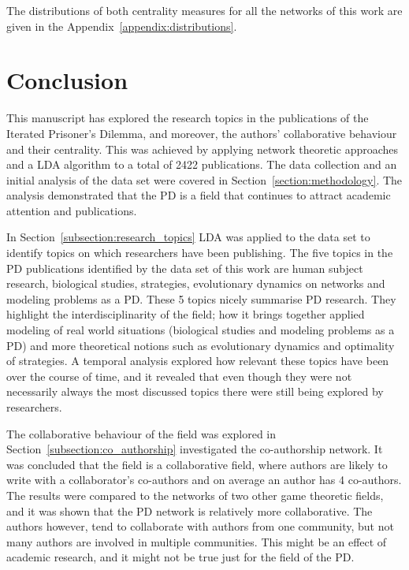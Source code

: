 \documentclass{article}
\theoremstyle{definition}
\begin{document}
The distributions of both centrality measures for all the networks of this
work are given in the Appendix~\ref{appendix:distributions}.

\section{Conclusion}\label{section:conclusion}

This manuscript has explored the research topics in the publications of the
Iterated Prisoner's Dilemma, and moreover, the authors' collaborative behaviour
and their centrality. This was achieved by
applying network theoretic approaches and a LDA algorithm to a total of 2422
publications.
The data collection and an initial analysis of the data set were covered in
Section~\ref{section:methodology}. The analysis  demonstrated that the PD is a
field that continues to attract academic attention and publications.

In Section~\ref{subsection:research_topics} LDA was applied to the data set to
identify topics on which researchers have been publishing. The five topics in
the PD publications identified by the data set of this work are human subject
research, biological studies, strategies, evolutionary dynamics on networks and
modeling problems as a PD. These 5 topics nicely summarise PD research. They
highlight the interdisciplinarity of the field; how it brings together applied
modeling of real world situations (biological studies and modeling problems as a
PD) and more theoretical notions such as evolutionary dynamics and optimality of
strategies. A temporal analysis explored how relevant these topics have been
over the course of time, and it revealed that even though they were not
necessarily always the most discussed topics there were still being explored
by researchers.

The collaborative behaviour of the field was explored in
Section~\ref{subsection:co_authorship} investigated the co-authorship
network. It was concluded that the field is a collaborative field, where authors
are likely to write with a collaborator's co-authors and on average an author
has 4 co-authors. The results were compared to the networks of two other game
theoretic fields, and it was shown that the PD network is relatively more collaborative. The
authors however, tend to collaborate with authors from one community, but not
many authors are involved in multiple communities. This might be an effect of
academic research, and it might not be true just for the field of the PD.
\end{document}
